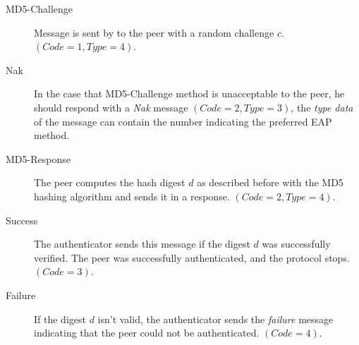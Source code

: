 \begin{description}
	\item [MD5-Challenge] Message is sent by to the peer with a random challenge $c$. $(Code=1, Type=4)$.
	\item [Nak] In the case that MD5-Challenge method is unacceptable to the peer, he should respond with a \textit{Nak} message $(Code=2, Type=3)$, the \textit{type data} of the message can contain the number indicating the preferred EAP method.
	\item [MD5-Response] The peer computes the hash digest $d$ as described before with the MD5 hashing algorithm and sends it in a response. $(Code=2, Type=4)$.
	\item [Success] The authenticator sends this message if the digest $d$ was successfully verified. The peer was successfully authenticated, and the protocol stops. $(Code=3)$.
	\item [Failure] If the digest $d$ isn't valid, the authenticator sends the \textit{failure} message indicating that the peer could not be authenticated. $(Code=4)$.
\end{description}



































